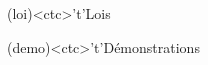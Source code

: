 \documentclass[../../main/main.tex]{subfiles}
\begin{document}
\begin{tcn}[%
		sidebyside, fontupper=\small, fontlower=\small
	]
	\begin{tcn}[nsp](loi)<ctc>'t'{Lois}
		\vspace{-25pt}
	\end{tcn}
	\begin{tcn}[nsp](demo)<ctc>'t'{Démonstrations}
		\vspace{-25pt}
	\end{tcn}

\end{tcn}
\end{document}
